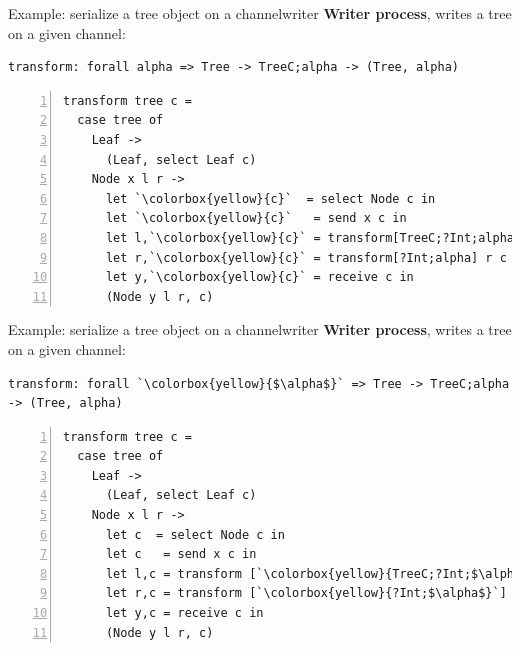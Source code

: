\documentclass[10pt]{beamer}
\begin{document}
\begin{frame}[fragile]{Example:  serialize a tree object on a channel\hfill{\color{mLightBrown}writer}}
	\textbf{Writer process}, writes a tree on a given channel:
	
\begin{lstlisting}
transform: forall alpha => Tree -> TreeC;alpha -> (Tree, alpha)
\end{lstlisting}

\begin{lstlisting}[numbers=left, xleftmargin=0.7cm, escapeinside=\`\`]
transform tree c =
  case tree of
    Leaf ->
      (Leaf, select Leaf c)
    Node x l r ->
      let `\colorbox{yellow}{c}`  = select Node c in
      let `\colorbox{yellow}{c}`   = send x c in 
      let l,`\colorbox{yellow}{c}` = transform[TreeC;?Int;alpha] l c in
      let r,`\colorbox{yellow}{c}` = transform[?Int;alpha] r c in
      let y,`\colorbox{yellow}{c}` = receive c in
      (Node y l r, c)
\end{lstlisting}

\end{frame}

\begin{frame}[fragile]{Example:  serialize a tree object on a channel\hfill{\color{mLightBrown}writer}}
	\textbf{Writer process}, writes a tree on a given channel:
	
\begin{lstlisting}[escapeinside=\`\`]
transform: forall `\colorbox{yellow}{$\alpha$}` => Tree -> TreeC;alpha -> (Tree, alpha)
\end{lstlisting}

\begin{lstlisting}[numbers=left, xleftmargin=0.7cm, escapeinside=\`\`]
transform tree c =
  case tree of
    Leaf ->
      (Leaf, select Leaf c)
    Node x l r ->
      let c  = select Node c in
      let c   = send x c in 
      let l,c = transform [`\colorbox{yellow}{TreeC;?Int;$\alpha$}`] l c in
      let r,c = transform [`\colorbox{yellow}{?Int;$\alpha$}`] r c in
      let y,c = receive c in
      (Node y l r, c)
\end{lstlisting}

\end{frame}
\end{document}
